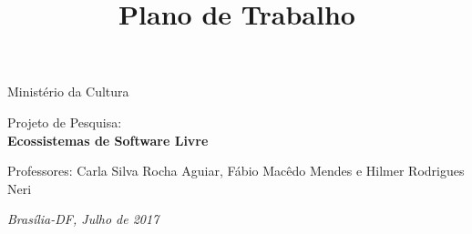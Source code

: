 \documentclass[preprint,11pt,oneside]{imsart}
\begin{document}
\begin{frontmatter}

\begin{aug}

\address{Fundação Universidade de Brasília -- FUB\\
Centro de Apoio ao Desenvolvimento Tecnológico -- CDT\\
Faculdade UnB Gama -- FGA\\
Laboratório Avançado de Produção, Pesquisa e Inovação em Software -- LAPPIS}

\end{aug}

\vspace{2cm}

\title{Plano de Trabalho}
\normalsize{Ministério da Cultura}

\vspace{2cm}

\begin{aug}
\normalsize{Projeto de Pesquisa:\\
\textbf{
Ecossistemas de Software Livre}}


\vspace{2cm}
\normalsize{Professores: Carla Silva Rocha Aguiar, Fábio Macêdo Mendes e Hilmer Rodrigues Neri}

\vspace{2cm}
\normalsize{\textit{Brasília-DF, Julho de 2017}}

\end{aug}

\end{frontmatter}

% 
\newpage


\newpage

\newpage


\newpage

\newpage


\newpage


% 
\newpage


\newpage


\newpage


\end{document}
